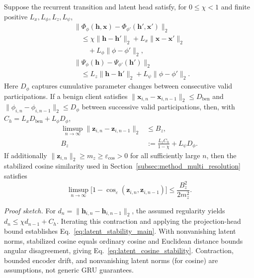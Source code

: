 \begin{proposition}
\label{prop:benign_representation_stability}
Suppose the recurrent transition and latent head satisfy, for $0\leq\chi<1$ and finite positive $L_x,L_\phi,L_z,L_\psi$,
\begin{equation}
\begin{aligned}
&\|\Phi_{\phi}(\mathbf{h},\mathbf{x})-\Phi_{\phi'}(\mathbf{h}',\mathbf{x}')\|_2\\
&\quad\leq\chi\|\mathbf{h}-\mathbf{h}'\|_2+L_x\|\mathbf{x}-\mathbf{x}'\|_2\\
&\qquad+L_\phi\|\phi-\phi'\|_2,\\
&\|\Psi_{\phi}(\mathbf{h})-\Psi_{\phi'}(\mathbf{h}')\|_2\\
&\quad\leq L_z\|\mathbf{h}-\mathbf{h}'\|_2+L_\psi\|\phi-\phi'\|_2.
\end{aligned}
\label{eq:theory_encoder_regularities}
\end{equation}
Here $D_\phi$ captures cumulative parameter changes between consecutive valid participations. If a benign client satisfies $\|\mathbf{x}_{i,n}-\mathbf{x}_{i,n-1}\|_2\leq D_{\mathrm{ben}}$ and $\|\phi_{i,n}-\phi_{i,n-1}\|_2\leq D_\phi$ between successive valid participations, then, with $C_h=L_xD_{\mathrm{ben}}+L_\phi D_\phi$,
\begin{equation}
\begin{aligned}
\limsup_{n\to\infty}\|\mathbf{z}_{i,n}-\mathbf{z}_{i,n-1}\|_2&\leq B_z,\\
B_z&:=\frac{L_zC_h}{1-\chi}+L_\psi D_\phi.
\end{aligned}
\label{eq:latent_stability_main}
\end{equation}
If additionally $\|\mathbf{z}_{i,n}\|_2\geq m_z\geq\varepsilon_{\cos}>0$ for all sufficiently large $n$, then the stabilized cosine similarity used in Section~\ref{subsec:method_multi_resolution} satisfies
\begin{equation}
\limsup_{n\to\infty}\big[1-\cos_{\varepsilon}(\mathbf{z}_{i,n},\mathbf{z}_{i,n-1})\big]\leq\frac{B_z^2}{2m_z^2}.
\label{eq:latent_cosine_stability}
\end{equation}
\end{proposition}

\noindent\textit{Proof sketch.} For $d_n=\|\mathbf{h}_{i,n}-\mathbf{h}_{i,n-1}\|_2$, the assumed regularity yields $d_n\leq\chi d_{n-1}+C_h$. Iterating this contraction and applying the projection-head bound establishes Eq.~\eqref{eq:latent_stability_main}. With nonvanishing latent norms, stabilized cosine equals ordinary cosine and Euclidean distance bounds angular disagreement, giving Eq.~\eqref{eq:latent_cosine_stability}. Contraction, bounded encoder drift, and nonvanishing latent norms (for cosine) are assumptions, not generic GRU guarantees.

